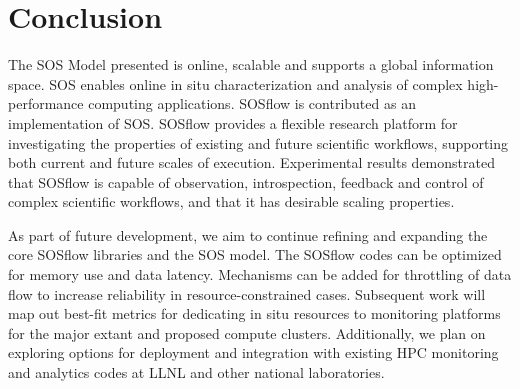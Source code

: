 

%
%
%

\section{Conclusion}
%
The SOS Model presented is online, scalable and supports a global
information space.
%
SOS enables online in situ characterization and analysis of complex
high-performance computing applications.
%
SOSflow is contributed as an implementation of SOS.
%
SOSflow provides a flexible research platform for investigating the
properties of existing and future scientific workflows, supporting
both current and future scales of execution.
%
Experimental results demonstrated that SOSflow is capable of
observation, introspection, feedback and control of complex scientific
workflows, and that it has desirable scaling properties.
%
\par
%
As part of future development, we aim to continue refining and
expanding the core SOSflow libraries and the SOS model.
%
The SOSflow codes can be optimized for memory use and data latency.
%
Mechanisms can be added for throttling of data flow to increase
reliability in resource-constrained cases.
%
Subsequent work will map out best-fit metrics for dedicating in situ
resources to monitoring platforms for the major extant and proposed
compute clusters.
%
Additionally, we plan on exploring options for deployment and
integration with existing HPC monitoring and analytics codes at LLNL
and other national laboratories.
%
%


